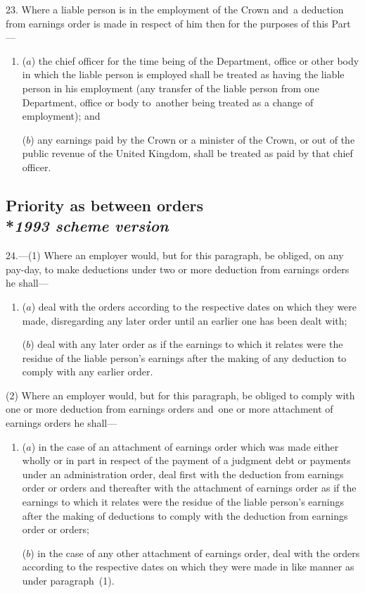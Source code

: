 \documentclass[12pt,a4paper]{article}
\begin{document}
23.  Where a liable person is in the employment of the Crown and~a deduction from earnings order is made in respect of him then for the purposes of this Part—
\begin{enumerate}\item[]
($a$) the chief officer for the time being of the Department, office or other body in which the liable person is employed shall be treated as having the liable person in his employment (any transfer of the liable person from one Department, office or body to~another being treated as a change of employment); and

($b$) any earnings paid by the Crown or a minister of the Crown, or out of the public revenue of the United Kingdom, shall be treated as paid by that chief officer.
\end{enumerate}

\subsection[24. Priority as between orders --- \emph{1993 scheme version}]{Priority as between orders\\*\emph{1993 scheme version}}

24.—(1) Where an employer would, but for this paragraph, be obliged, on any pay-day, to make deductions under two or more deduction from earnings orders he shall—
\begin{enumerate}\item[]
($a$) deal with the orders according to the respective dates on which they were made, disregarding any later order until an earlier one has been dealt with;

($b$) deal with any later order as if the earnings to which it relates were the residue of the liable person’s earnings after the making of any deduction to comply with any earlier order.
\end{enumerate}

(2) Where an employer would, but for this paragraph, be obliged to comply with one or more deduction from earnings orders and~one or more attachment of earnings orders he shall—
\begin{enumerate}\item[]
($a$) in the case of an attachment of earnings order which was made either wholly or in part in respect of the payment of a judgment debt or payments under an administration order, deal first with the deduction from earnings order or orders and thereafter with the attachment of earnings order as if the earnings to which it relates were the residue of the liable person’s earnings after the making of deductions to comply with the deduction from earnings order or orders;

($b$) in the case of any other attachment of earnings order, deal with the orders according to the respective dates on which they were made in like manner as under paragraph~(1).\end{enumerate}
\end{document}
